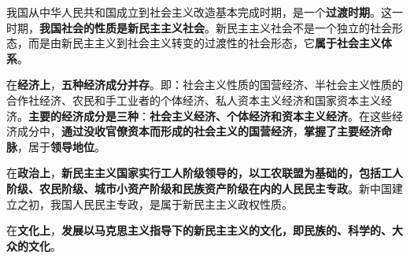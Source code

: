 我国从中华人民共和国成立到社会主义改造基本完成时期，是一个\textbf{{过渡时期}}。这一时期，\textbf{{我国社会的性质是新民主主义社会}}。新民主主义社会不是一个独立的社会形态，而是由新民主主义到社会主义转变的过渡性的社会形态，它\textbf{{属于社会主义体系}}。

在\textbf{{经济上}}，\textbf{{五种经济成分并存}}。即：社会主义性质的国营经济、半社会主义性质的合作社经济、农民和手工业者的个体经济、私人资本主义经济和国家资本主义经济。\textbf{{主要的经济成分是三种}}：\textbf{{社会主义经济、个体经济和资本主义经济}}。在这些经济成分中，\textbf{{通过没收官僚资本而形成的社会主义的国营经济}}，\textbf{{掌握了主要经济命脉}}，居于\textbf{{领导地位}}。

在\textbf{{政治上}}，\textbf{{新民主主义国家实行工人阶级领导的，以工农联盟为基础的，包括工人阶级、农民阶级、城市小资产阶级和民族资产阶级在内的人民民主专政}}。新中国建立之初，我国人民民主专政，是属于新民主主义政权性质。

{在}\textbf{{文化上}}{，}\textbf{{发展以马克思主义指导下的新民主主义的文化，即民族的、科学的、大众的文化}}{。}
